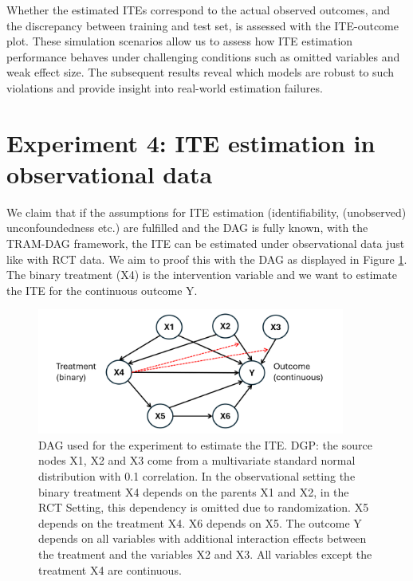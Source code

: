 Whether the estimated ITEs correspond to the actual observed outcomes, and the discrepancy between training and test set, is assessed with the ITE-outcome plot.
These simulation scenarios allow us to assess how ITE estimation performance behaves under challenging conditions such as omitted variables and weak effect size. The subsequent results reveal which models are robust to such violations and provide insight into real-world estimation failures.






\section{Experiment 4: ITE estimation in observational data}



We claim that if the assumptions for ITE estimation (identifiability, (unobserved) unconfoundedness etc.) are fulfilled and the DAG is fully known, with the TRAM-DAG framework, the ITE can be estimated under observational data just like with RCT data. We aim to proof this with the DAG as displayed in Figure \ref{fig:ite_dag_observational}. The binary treatment (X4) is the intervention variable and we want to estimate the ITE for the continuous outcome Y. 


\begin{figure}[H]
\centering
\includegraphics[width=0.9\textwidth]{img/dag_ITE_observational.png}
\caption{DAG used for the experiment to estimate the ITE. DGP: the source nodes X1, X2 and X3 come from a multivariate standard normal distribution with 0.1 correlation. In the observational setting the binary treatment X4 depends on the parents X1 and X2, in the RCT Setting, this dependency is omitted due to randomization. X5 depends on the treatment X4. X6 depends on X5. The outcome Y depends on all variables with additional interaction effects between the treatment and the variables X2 and X3. All variables except the treatment X4 are continuous.}
\label{fig:ite_dag_observational}
\end{figure}

